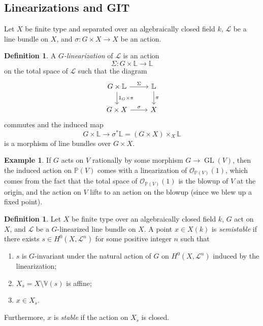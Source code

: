 \documentclass{amsart}
\theoremstyle{definition}
\newtheorem{defn}[thm]{Definition}
\newtheorem{exm}[thm]{Example}
\theoremstyle{remark}
\theoremstyle{plain}
\theoremstyle{definition}
\theoremstyle{remark}
\renewcommand{\L}{\mathbb{L}}
\renewcommand{\P}{\mathbb{P}}
\newcommand{\mc}[1]{\mathcal{#1}}
\newcommand{\on}[1]{\operatorname{#1}}
\newcommand{\1}{\mathbf{1}}
\newcommand{\2}{\mathbf{2}}
\newcommand{\3}{\mathbf{3}}
\begin{document}
\subsection{Linearizations and GIT}%
\label{sub:Linearizations and GIT}

Let \(X\) be finite type and separated over an algebraically closed field \(k\), \(\mc{L}\) be a line bundle on \(X\), and \(\sigma \colon G \times X \to X\) be an action.

\begin{defn}
    A \textit{\(G\)-linearization} of \(\mc{L}\) is an action
    \[ \Sigma \colon G \times \L \to \L \]
    on the total space of \(\mc{L}\) such that the diagram
    \begin{equation*}
    \begin{tikzcd}
        G \times \L \ar{r}{\Sigma} \ar{d}{1_G \times \pi} & \L \ar{d}{\pi} \\
        G \times X \ar{r}{\sigma} & X
    \end{tikzcd}
    \end{equation*}
    commutes and the induced map
    \[ G \times \L \to \sigma^* \L = (G \times X) \times_X \L \]
    is a morphism of line bundles over \(G \times X\).
\end{defn}

\begin{exm}
    If \(G\) acts on \(V\) rationally by some morphism \(G \to \on{GL}(V)\), then the induced action on \(\P(V)\) comes with a linearization of \(\mc{O}_{\P(V)}(1)\), which comes from the fact that the total space of \(\mc{O}_{\P(V)}(1)\) is the blowup of \(V\) at the origin, and the action on \(V\) lifts to an action on the blowup (since we blew up a fixed point).
\end{exm}

\begin{defn}
    Let \(X\) be finite type over an algebraically closed field \(k\), \(G\) act on \(X\), and \(\mc{L}\) be a \(G\)-linearized line bundle on \(X\). A point \(x \in X(k)\) is \textit{semistable} if there exists \(s \in H^0(X, \mc{L}^n)\) for some positive integer \(n\) such that
    \begin{enumerate}
        \item \(s\) is \(G\)-invariant under the natural action of \(G\) on \(H^0(X, \mc{L}^n)\) induced by the linearization;
        \item \(X_s = X \setminus \mathbb{V}(s)\) is affine;
        \item \(x \in X_s\).
    \end{enumerate}
    Furthermore, \(x\) is \textit{stable} if the action on \(X_s\) is closed.
\end{defn}
\end{document}
